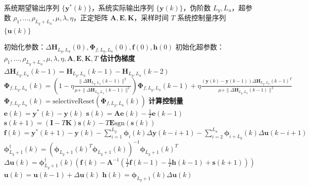     \begin{algorithm}
    \caption{MFAC-FFDL-SMC 全格式动态线性化无模型自适应滑模控制}
    \label{mfac_ffdl_smc}
    \small
    \begin{algorithmic}
        \REQUIRE 系统期望输出序列 $\{ \boldsymbol{y}^*(k) \}$，系统实际输出序列 $\{ \boldsymbol{y}(k) \}$，伪阶数 $L_y, L_u$，超参数 $\rho_1, \dots, \rho_{L_y+L_u}, \mu, \lambda, \eta$，正定矩阵 $\boldsymbol{A}, \boldsymbol{E}, \boldsymbol{K}$，采样时间 $T$
        \ENSURE 系统控制量序列 $\{ \boldsymbol{u}(k) \}$

        \STATE 初始化参数：$\Delta \boldsymbol{H}_{L_y,L_u}(0), \boldsymbol{\Phi}_{f,L_y,L_u}(0), \boldsymbol{f}(0), \boldsymbol{h}(0)$
        \STATE 初始化超参数：$\rho_1, \dots, \rho_{L_y+L_u}, \mu, \lambda, \eta, \boldsymbol{A}, \boldsymbol{E}, \boldsymbol{K}, T$
            \STATE \textbf{估计伪梯度}
            \STATE $\Delta \boldsymbol{H}_{L_y,L_u}(k-1) = \boldsymbol{H}_{L_y,L_u}(k-1) - \boldsymbol{H}_{L_y,L_u}(k-2)$
            \STATE $\boldsymbol{\Phi}_{f,L_y,L_u}(k) = \left(1 - \eta \frac{\|\Delta \boldsymbol{H}_{L_y,L_u}(k-1)\|^2}{\mu + \|\Delta \boldsymbol{H}_{L_y,L_u}(k-1)\|^2}\right) \boldsymbol{\Phi}_{f,L_y,L_u}(k-1) + \eta \frac{(\boldsymbol{y}(k) - \boldsymbol{y}(k-1)) \Delta \boldsymbol{H}_{L_y,L_u}(k-1)^T}{\mu + \|\Delta \boldsymbol{H}_{L_y,L_u}(k-1)\|^2}$
            \STATE $\boldsymbol{\Phi}_{f,L_y,L_u}(k) = \text{selectiveReset}(\boldsymbol{\Phi}_{f,L_y,L_u}(k))$ 
            \STATE \textbf{计算控制量}
            \STATE $\boldsymbol{e}(k) = \boldsymbol{y}^*(k) - \boldsymbol{y}(k)$ 
            \STATE $\boldsymbol{s}(k) = \boldsymbol{A} \boldsymbol{e}(k) - \frac{1}{T} \boldsymbol{e}(k-1)$ 
            \STATE $\boldsymbol{s}(k+1) = (\boldsymbol{I} - T \boldsymbol{K}) \boldsymbol{s}(k) - T \boldsymbol{E} \text{sgn}(\boldsymbol{s}(k))$ 
            \STATE $\boldsymbol{f}(k) = \boldsymbol{y}^*(k+1) - \boldsymbol{y}(k) - \sum_{i=1}^{L_y} \boldsymbol{\phi}_i(k) \Delta \boldsymbol{y}(k - i + 1) - \sum_{i=2}^{L_u} \boldsymbol{\phi}_{i+L_y}(k) \Delta \boldsymbol{u}(k - i + 1)$ 
            \STATE $\boldsymbol{\phi}_{L_y+1}^\dagger(k) = \left( \boldsymbol{\phi}_{L_y+1}(k)^T \boldsymbol{\phi}_{L_y+1}(k) \right)^{-1} \boldsymbol{\phi}_{L_y+1}(k)^T$ 
            \STATE $\Delta \boldsymbol{u}(k) = \boldsymbol{\phi}_{L_y+1}^\dagger(k) \left( \boldsymbol{f}(k) - \boldsymbol{A}^{-1} \left( \frac{1}{T} \boldsymbol{f}(k-1) - \frac{1}{T} \boldsymbol{h}(k-1) + \boldsymbol{s}(k+1) \right) \right)$ 
            \STATE $\boldsymbol{u}(k) = \boldsymbol{u}(k-1) + \Delta \boldsymbol{u}(k)$ 
            \STATE $\boldsymbol{h}(k) = \boldsymbol{\phi}_{L_y+1}(k) \Delta \boldsymbol{u}(k)$ 
        \ENDWHILE
    \end{algorithmic}
    \end{algorithm}

